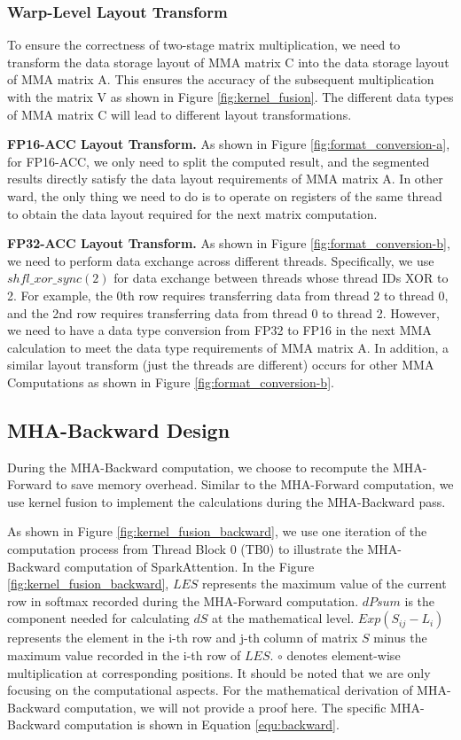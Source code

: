 \documentclass[10pt,twocolumn]{article}
\begin{document}
\subsubsection{Warp-Level Layout Transform}\label{sec:Warp-Level_Layout_Transform}
To ensure the correctness of two-stage matrix multiplication, we need to transform the data storage layout of MMA matrix C into the data storage layout of MMA matrix A. 
This ensures the accuracy of the subsequent multiplication with the matrix V as shown in Figure \ref{fig:kernel_fusion}. 
The different data types of MMA matrix C will lead to different layout transformations. 

\textbf{FP16-ACC Layout Transform.}
As shown in Figure \ref{fig:format_conversion-a}, for FP16-ACC, we only need to split the computed result, and the segmented results directly satisfy the data layout requirements of MMA matrix A. 
In other ward, the only thing we need to do is to operate on registers of the same thread to obtain the data layout required for the next matrix computation. 

\textbf{FP32-ACC Layout Transform.}
As shown in Figure \ref{fig:format_conversion-b}, we need to perform data exchange across different threads. 
Specifically, we use $shfl\_xor\_sync(2)$ for data exchange between threads whose thread IDs XOR to 2. 
For example, the 0th row requires transferring data from thread 2 to thread 0, and the 2nd row requires transferring data from thread 0 to thread 2. 
However, we need to have a data type conversion from FP32 to FP16 in the next MMA calculation to meet the data type requirements of MMA matrix A.
In addition, a similar layout transform (just the threads are different) occurs for other MMA Computations as shown in Figure \ref{fig:format_conversion-b}.

\subsection{MHA-Backward Design}
During the MHA-Backward computation, we choose to recompute the MHA-Forward to save memory overhead.
Similar to the MHA-Forward computation, we use kernel fusion to implement the calculations during the MHA-Backward pass.

As shown in Figure \ref{fig:kernel_fusion_backward}, we use one iteration of the computation process from Thread Block 0 (TB0) to illustrate the MHA-Backward computation of SparkAttention. 
In the Figure \ref{fig:kernel_fusion_backward}, $LES$ represents the maximum value of the current row in softmax recorded during the MHA-Forward computation. 
$dPsum$ is the component needed for calculating $dS$ at the mathematical level.
$Exp(S_{ij}-L_i)$ represents the element in the i-th row and j-th column of matrix $S$ minus the maximum value recorded in the i-th row of $LES$.
$\circ$ denotes element-wise multiplication at corresponding positions.
It should be noted that we are only focusing on the computational aspects. 
For the mathematical derivation of MHA-Backward computation, we will not provide a proof here.
The specific MHA-Backward computation is shown in Equation \ref{equ:backward}.
\end{document}
